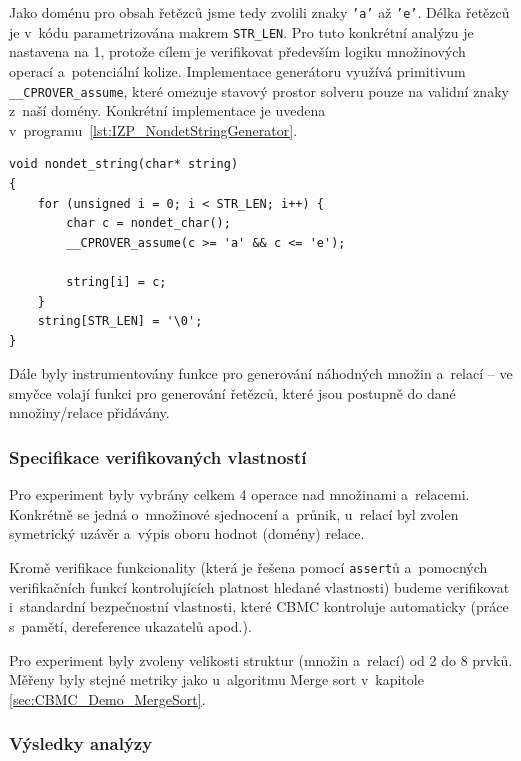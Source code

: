 \documentclass[a4paper, 11pt]{article}
\begin{document}
Jako doménu pro obsah řetězců jsme tedy zvolili znaky \texttt{'a'} až \texttt{'e'}.
Délka řetězců je v~kódu parametrizována makrem \texttt{STR\_LEN}.
Pro tuto konkrétní analýzu je nastavena na 1, protože cílem je verifikovat především logiku množinových operací a~potenciální kolize.
Implementace generátoru využívá primitivum \texttt{\_\_CPROVER\_assume}, které omezuje stavový prostor solveru pouze na validní znaky z~naší domény.
Konkrétní implementace je uvedena v~programu~\ref{lst:IZP_NondetStringGenerator}.
\begin{listing}[h]
    \caption{Implementace instrumentovaného generování nedeterministických řetězců při analýze relační a~množinové kalkulačky.}
    \label{lst:IZP_NondetStringGenerator}
    \begin{verbatim}
void nondet_string(char* string)
{
    for (unsigned i = 0; i < STR_LEN; i++) {
        char c = nondet_char();
        __CPROVER_assume(c >= 'a' && c <= 'e');
    
        string[i] = c;
    }
    string[STR_LEN] = '\0';
}
    \end{verbatim}
\end{listing}

Dále byly instrumentovány funkce pro generování náhodných množin a~relací -- ve smyčce volají funkci pro generování řetězců, které jsou postupně do dané množiny/relace přidávány.

\subsubsection{Specifikace verifikovaných vlastností}

Pro experiment byly vybrány celkem 4 operace nad množinami a~relacemi.
Konkrétně se jedná o~množinové sjednocení a~průnik, u~relací byl zvolen symetrický uzávěr a~výpis oboru hodnot (domény) relace.

Kromě verifikace funkcionality (která je řešena pomocí \texttt{assert}ů a~pomocných verifikačních funkcí kontrolujících platnost hledané vlastnosti) budeme verifikovat i~standardní bezpečnostní vlastnosti, které CBMC kontroluje automaticky (práce s~pamětí, dereference ukazatelů apod.).

Pro experiment byly zvoleny velikosti struktur (množin a~relací) od 2 do 8 prvků.
Měřeny byly stejné metriky jako u~algoritmu Merge sort v~kapitole \ref{sec:CBMC_Demo_MergeSort}.

\subsubsection{Výsledky analýzy}
\end{document}
